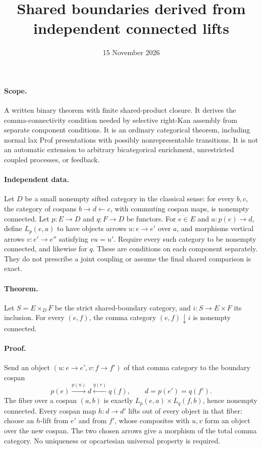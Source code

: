 \documentclass{article}
\title{Shared boundaries derived from independent connected lifts}
\date{15 November 2026}
\begin{document}
\maketitle
\paragraph{Scope.} A written binary theorem with finite shared-product closure. It derives the comma-connectivity condition needed by selective right-Kan assembly from separate component conditions. It is an ordinary categorical theorem, including normal lax Prof presentations with possibly nonrepresentable transitions. It is not an automatic extension to arbitrary bicategorical enrichment, unrestricted coupled processes, or feedback.

\paragraph{Independent data.} Let $D$ be a small nonempty sifted category in the classical sense: for every $b,c$, the category of cospans $b\to d\leftarrow c$, with commuting cospan maps, is nonempty connected. Let $p:E\to D$ and $q:F\to D$ be functors. For $e\in E$ and $a:p(e)\to d$, define $L_p(e,a)$ to have objects arrows $u:e\to e'$ over $a$, and morphisms vertical arrows $v:e'\to e''$ satisfying $vu=u'$. Require every such category to be nonempty connected, and likewise for $q$. These are conditions on each component separately. They do not prescribe a joint coupling or assume the final shared comparison is exact.

\paragraph{Theorem.} Let $S=E\times_D F$ be the strict shared-boundary category, and $i:S\to E\times F$ its inclusion. For every $(e,f)$, the comma category $(e,f)\downarrow i$ is nonempty connected.

\paragraph{Proof.} Send an object $(u:e\to e',v:f\to f')$ of that comma category to the boundary cospan
\[
 p(e)\xrightarrow{p(u)}d\xleftarrow{q(v)}q(f),\qquad d=p(e')=q(f').
\]
The fiber over a cospan $(a,b)$ is exactly $L_p(e,a)\times L_q(f,b)$, hence nonempty connected. Every cospan map $h:d\to d'$ lifts out of every object in that fiber: choose an $h$-lift from $e'$ and from $f'$, whose composites with $u,v$ form an object over the new cospan. The two chosen arrows give a morphism of the total comma category. No uniqueness or opcartesian universal property is required.
\end{document}
